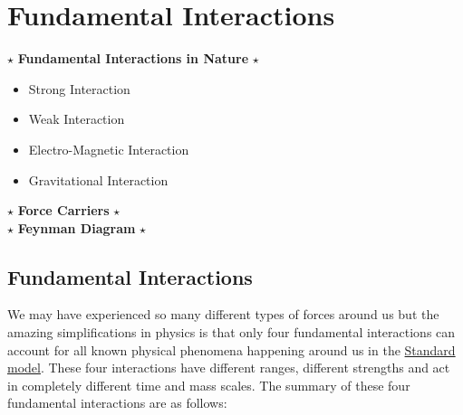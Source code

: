 \chapter{Fundamental Interactions}
\label{chap:funda}
    \begin{tcolorbox} [colframe=blue!15!black,colback=yellow!29.05!white,arc=1em,fonttitle=\bfseries,title= Key Objectives:, width = \textwidth]
        $\star$ \textbf{Fundamental Interactions in Nature} $\star$
        \begin{itemize}
            \item Strong Interaction
            \item Weak Interaction
            \item Electro-Magnetic Interaction
            \item Gravitational Interaction
        \end{itemize}
       $\star$ \textbf{Force Carriers} $\star$ \\
       $\star$ \textbf{Feynman Diagram} $\star$
       
     \end{tcolorbox}
    
    \section{Fundamental Interactions}
 We may have experienced so many different types of forces around us but the amazing
simplifications in physics is that only four fundamental interactions can account for all known physical phenomena happening around us in the \href{https://en.m.wikipedia.org/wiki/Standard_Model}{{{Standard model}}}.
These four interactions have different ranges, different strengths and act in completely different time and mass scales. 
The summary of these four fundamental interactions are as follows: \\
  
